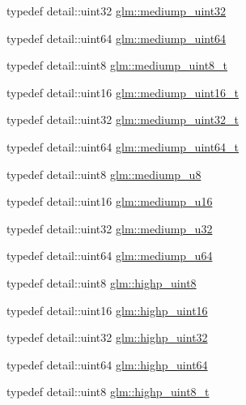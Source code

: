 \begin{DoxyCompactItemize}
\item 
typedef detail\-::uint32 \hyperlink{group__gtc__type__precision_ga861dbd1051f488e425b3966001b568e5}{glm\-::mediump\-\_\-uint32}
\item 
typedef detail\-::uint64 \hyperlink{group__gtc__type__precision_ga6685788d15d0a973ee7c2460d0456dc1}{glm\-::mediump\-\_\-uint64}
\item 
typedef detail\-::uint8 \hyperlink{group__gtc__type__precision_gadfa38f3c245d371c4b2079f1fd68928b}{glm\-::mediump\-\_\-uint8\-\_\-t}
\item 
typedef detail\-::uint16 \hyperlink{group__gtc__type__precision_ga0b385466deac5ac96061ef2cdd6db20f}{glm\-::mediump\-\_\-uint16\-\_\-t}
\item 
typedef detail\-::uint32 \hyperlink{group__gtc__type__precision_gac7782c1e393f9ad47e41a177a685f287}{glm\-::mediump\-\_\-uint32\-\_\-t}
\item 
typedef detail\-::uint64 \hyperlink{group__gtc__type__precision_gaa97354d3120a6dc029a5e9563723de18}{glm\-::mediump\-\_\-uint64\-\_\-t}
\item 
typedef detail\-::uint8 \hyperlink{group__gtc__type__precision_gac04b372784392e82bd557f300c4de097}{glm\-::mediump\-\_\-u8}
\item 
typedef detail\-::uint16 \hyperlink{group__gtc__type__precision_ga6745262ef6a6fdb8637b2387ef924828}{glm\-::mediump\-\_\-u16}
\item 
typedef detail\-::uint32 \hyperlink{group__gtc__type__precision_gad0c27a525045c299a92306eb4cd7c13a}{glm\-::mediump\-\_\-u32}
\item 
typedef detail\-::uint64 \hyperlink{group__gtc__type__precision_ga00c51a16fa190b0a90205d50d6d8a44a}{glm\-::mediump\-\_\-u64}
\item 
typedef detail\-::uint8 \hyperlink{group__gtc__type__precision_ga2c27c6dd26e893786f04b10f99c1ee95}{glm\-::highp\-\_\-uint8}
\item 
typedef detail\-::uint16 \hyperlink{group__gtc__type__precision_ga4d32967d45ba8365e2a05eaaac85e978}{glm\-::highp\-\_\-uint16}
\item 
typedef detail\-::uint32 \hyperlink{group__gtc__type__precision_ga3145e44c73e2df7dfe4f3cb65974bf22}{glm\-::highp\-\_\-uint32}
\item 
typedef detail\-::uint64 \hyperlink{group__gtc__type__precision_ga8079c653e20cda03d34b99de629a7b09}{glm\-::highp\-\_\-uint64}
\item 
typedef detail\-::uint8 \hyperlink{group__gtc__type__precision_ga9ba529fcc75b82d23da979f0ce6e4518}{glm\-::highp\-\_\-uint8\-\_\-t}

\end{DoxyCompactItemize}
